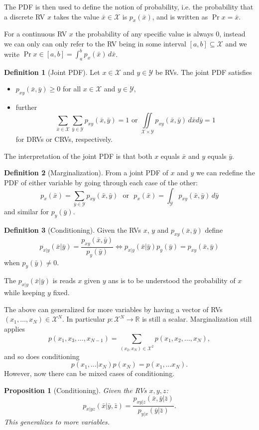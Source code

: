 \documentclass[margin=small]{hsrzf}
\theoremstyle{plain}
\newtheorem{prop}{Proposition}[section]
\theoremstyle{definition}
\newtheorem{defn}{Definition}[section]
\theoremstyle{remark}
\begin{document}
The PDF is then used to define the notion of probability, i.e. the probability
that a discrete RV $x$ takes the value $\bar{x} \in \mathcal{X}$ is
$p_x(\bar{x})$, and is written as $\Pr{x = \bar{x}}$.

For a continuous RV $x$ the probability of any specific value is always 0,
instead we can only can only refer to the RV being in some interval $[a,b]
\subseteq \mathcal{X}$ and we write $\Pr{x \in [a,b]} = \int_a^b p_x(\bar{x})
\,d\bar{x}$.

\begin{defn}[Joint PDF]
  Let $x \in \mathcal{X}$ and $y \in \mathcal{Y}$ be RVs. The joint PDF
  satisfies
  \begin{itemize}
    \item $p_{xy}(\bar{x}, \bar{y}) \geq 0$ for all $x \in\mathcal{X}$ and $y
      \in \mathcal{Y}$,
    \item further
      \[
        \sum_{\bar{x}\in\mathcal{X}}\sum_{\bar{y}\in\mathcal{Y}}
        p_{xy}(\bar{x}, \bar{y}) = 1
        \text{ or }
        \iint\limits_{\mathcal{X}\times\mathcal{Y}} p_{xy}(\bar{x}, \bar{y})
        \,d\bar{x}d\bar{y} = 1
      \]
      for DRVs or CRVs, respectively.
  \end{itemize}
\end{defn}

The interpretation of the joint PDF is that both $x$ equals $\bar{x}$ and $y$
equals $\bar{y}$.

\begin{defn}[Marginalization]
  From a joint PDF of $x$ and $y$ we can redefine the PDF of either variable
  by going through each case of the other:
  \[
    p_x(\bar{x}) = \sum_{\bar{y} \in \mathcal{Y}} p_{xy} (\bar{x}, \bar{y})
    \text{~~or~~}
    p_x(\bar{x}) = \int_\mathcal{Y} p_{xy} (\bar{x}, \bar{y}) \,
    d\bar{y}
  \]
  and similar for $p_y(\bar{y})$.
\end{defn}

\begin{defn}[Conditioning]
  Given the RVs $x$, $y$ and $p_{xy}(\bar{x}, \bar{y})$ define
  \[
    p_{x|y}(\bar{x} | \bar{y}) = \frac{p_{xy}(\bar{x}, \bar{y})}{p_y(\bar{y})}
    \iff
    p_{x|y}(\bar{x} | \bar{y}) p_y(\bar{y}) = p_{xy}(\bar{x}, \bar{y})
  \]
  when $p_y(\bar{y}) \neq 0$.
\end{defn}

The $p_{x|y}(\bar{x} | \bar{y})$ is reads $x$ given $y$ ans is to be
understood the probability of $x$ while keeping $y$ fixed.

The above can generalized for more variables by having a vector of RVs
$(x_1,\ldots, x_N) \in \mathcal{X}^N$. In particular $p : \mathcal{X}^N \to
\mathbb{R}$ is still a scalar. Marginalization still applies
\[
  p(x_1, x_3, \ldots, x_{N-1}) = \sum_{(x_{2}, x_{N}) \in \mathcal{X}^2}
  p(x_1, x_2, \ldots, x_N),
\]
and so does conditioning
\[
  p(x_1, \ldots | x_N) p(x_N) = p(x_1, \ldots x_N).
\]
However, now there can be mixed cases of conditioning.
\begin{prop}[Conditioning]
  Given the RVs $x, y, z$:
  \[
    p_{x|yz}(\bar{x} | \bar{y}, \bar{z}) = 
      \frac{p_{xy|z}(\bar{x},\bar{y} | \bar{z})}{p_{y|x}(\bar{y} | \bar{z})}.
  \]
  This generalizes to more variables.
\end{prop}
\end{document}
